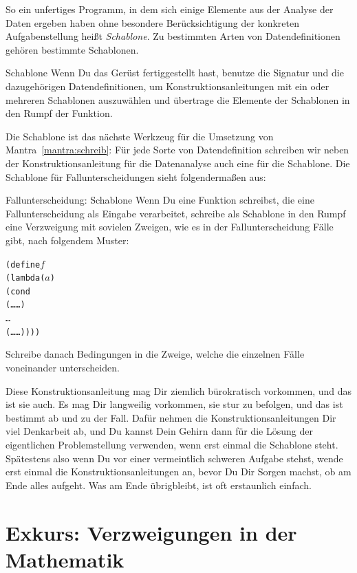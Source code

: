 So ein unfertiges Programm, in dem sich einige Elemente aus der
Analyse der Daten ergeben haben ohne besondere Berücksichtigung der
konkreten Aufgabenstellung heißt \textit{Schablone}.  Zu bestimmten
Arten von Datendefinitionen gehören bestimmte Schablonen.

\begin{konstruktionsanleitung}{Schablone}
  Wenn Du das Gerüst fertiggestellt hast, benutze die Signatur und die
  dazugehörigen Datendefinitionen, um Konstruktionsanleitungen mit ein
  oder mehreren Schablonen auszuwählen und übertrage die Elemente der
  Schablonen in den Rumpf der Funktion.
\end{konstruktionsanleitung}
%
Die Schablone ist das nächste Werkzeug für die Umsetzung von
Mantra~\ref{mantra:schreib}:
%
\mantraschreib*
%
\noindent Für jede Sorte von Datendefinition schreiben wir neben der
Konstruktionsanleitung für die Datenanalyse auch eine für die
Schablone.  Die Schablone für Fallunterscheidungen sieht
folgendermaßen aus:
%
\begin{konstruktionsanleitung}{Fallunterscheidung: Schablone}
  \label{ka:fallunterscheidung-schablone}
  Wenn Du eine Funktion schreibst, die eine Fallunterscheidung als
  Eingabe verarbeitet, schreibe als Schablone in den Rumpf eine
  Verzweigung mit sovielen Zweigen, wie es in der Fallunterscheidung
  Fälle gibt, nach folgendem Muster:
\begin{alltt}
(define \(f\)
  (lambda (\(a\))
    (cond
      (\ldots{} \ldots)
      \ldots
      (\ldots{} \ldots))))
\end{alltt}
  Schreibe danach Bedingungen in die Zweige, welche die einzelnen
  Fälle voneinander unterscheiden.
\end{konstruktionsanleitung}
%
Diese Konstruktionsanleitung mag Dir ziemlich bürokratisch vorkommen,
und das ist sie auch.  Es mag Dir langweilig vorkommen, sie stur zu
befolgen, und das ist bestimmt ab und zu der Fall.  Dafür nehmen die
Konstruktionsanleitungen Dir viel Denkarbeit ab, und Du kannst Dein
Gehirn dann für die Lösung der eigentlichen Problemstellung verwenden,
wenn erst einmal die Schablone steht.  Spätestens also wenn Du vor
einer vermeintlich schweren Aufgabe stehst, wende erst einmal die
Konstruktionsanleitungen an, bevor Du Dir Sorgen machst, ob am Ende
alles aufgeht.  Was am Ende übrigbleibt, ist oft erstaunlich einfach.

\section{Exkurs: Verzweigungen in der Mathematik}

